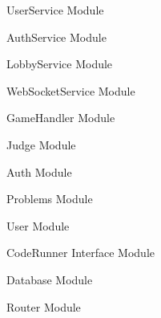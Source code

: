 \documentclass[12pt, titlepage]{article}
\newcounter{mnum}
\newcommand{\mthemnum}{M\themnum}
\begin{document}
\begin{description}
\item [ \mthemnum \label{mUserService}:] UserService Module
\item [ \mthemnum \label{mAuthService}:] AuthService Module
\item [ \mthemnum \label{mLobbyService}:] LobbyService Module
\item [ \mthemnum \label{mWebSocketService}:] WebSocketService Module
\item [ \mthemnum \label{mGameHandler}:] GameHandler Module
\item [ \mthemnum \label{mJudge}:] Judge Module
\item [ \mthemnum \label{mAuth}:] Auth Module
\item [ \mthemnum \label{mProblems}:] Problems Module
\item [ \mthemnum \label{mUser}:] User Module
\item [ \mthemnum \label{mCodeRunner}:] CodeRunner Interface Module
\item [ \mthemnum \label{mDatabase}:] Database Module
\item [ \mthemnum \label{mRouter}:] Router Module


\item 
\end{description}
\end{document}
